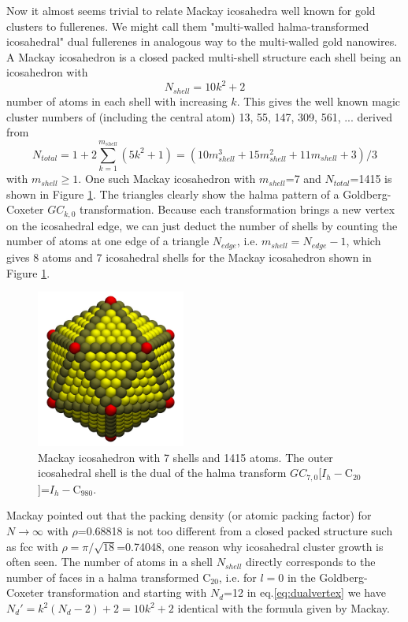 Now it almost seems trivial to relate Mackay icosahedra\autocite{Mackay-1962} well known for gold clusters\autocite{Nam2002,Wang-Wang-2011} to fullerenes. We might call them "multi-walled halma-transformed icosahedral" dual fullerenes in analogous way to the multi-walled gold nanowires. A Mackay icosahedron is a closed packed multi-shell structure each shell being an icosahedron with
\begin{equation}
  \label{eq:mackay} 
N_{shell}=10k^2+2
\end{equation}
number of atoms in each shell with increasing $k$. This gives the well known magic cluster numbers of (including the central atom) 13, 55, 147, 309, 561, ... derived from
\begin{equation}
  \label{eq:mackaytotal} 
N_{total}=1+2\sum_{k=1}^{m_{shell}}\left( 5k^2+1 \right)=(10m_{shell}^3+15m_{shell}^2+11m_{shell}+3)/3
\end{equation}
with $m_{shell} \ge 1$. One such Mackay icosahedron with $m_{shell}$=7 and $N_{total}$=1415 is shown in Figure \ref{fig:mackaylarge}. The triangles clearly show the halma pattern of a Goldberg-Coxeter $GC_{k,0}$ transformation. Because each transformation brings a new vertex on the icosahedral edge, we can just deduct the number of shells by counting the number of atoms at one edge of a triangle $N_{edge}$, i.e. $m_{shell}=N_{edge}-1$, which gives 8 atoms and 7 icosahedral shells for the Mackay icosahedron shown in Figure \ref{fig:mackaylarge}.
\begin{figure}[htbp]
\begin{center}
\includegraphics[width=4.9cm]{golddual/ico.jpg}
\caption{Mackay icosahedron with 7 shells and 1415 atoms. The outer icosahedral shell is the dual of the halma transform $GC_{7,0}$[$I_h-$C$_{20}$]=$I_h-$C$_{980}$.}
\label{fig:mackaylarge}
\end{center}
\end{figure}
Mackay pointed out that the packing density (or atomic packing factor) for $N \rightarrow \infty$ with $\rho$=0.68818 is not too different from a closed packed structure such as fcc with $\rho=\pi/\sqrt{18}$=0.74048,\autocite{Mackay-1962} one reason why icosahedral cluster growth is often seen. The number of atoms in a shell $N_{shell}$ directly corresponds to the number of faces in a halma transformed C$_{20}$, i.e. for $l=0$ in the Goldberg-Coxeter transformation and starting with $N_d$=12 in eq.\ref{eq:dualvertex} we have $N_d'=k^2(N_d-2)+2 = 10k^2+2$ identical with the formula given by Mackay. 


